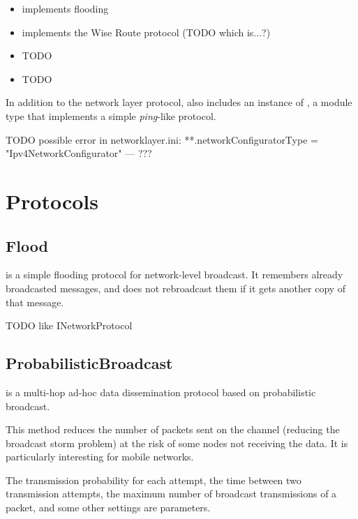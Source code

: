 \begin{itemize}
  \item {} implements flooding
  \item {} implements the Wise Route protocol (TODO which is...?)
  \item {} TODO
  \item {} TODO
\end{itemize}

In addition to the network layer protocol,  
also includes an instance of , a module type that
implements a simple \textit{ping}-like protocol.

TODO possible error in networklayer.ini:
**.networkConfiguratorType = "Ipv4NetworkConfigurator" --- ???

\section{Protocols}

\subsection{Flood}

 is a simple flooding protocol for network-level broadcast.
It remembers already broadcasted messages, and does not rebroadcast 
them if it gets another copy of that message.

TODO like INetworkProtocol

\subsection{ProbabilisticBroadcast}

 is a multi-hop ad-hoc data dissemination 
protocol based on probabilistic broadcast.

This method reduces the number of packets sent on the channel (reducing the
broadcast storm problem) at the risk of some nodes not receiving the data.
It is particularly interesting for mobile networks.

The transmission probability for each attempt, the time between two transmission
attempts, the maximum number of broadcast transmissions of a packet, and
some other settings are parameters.


